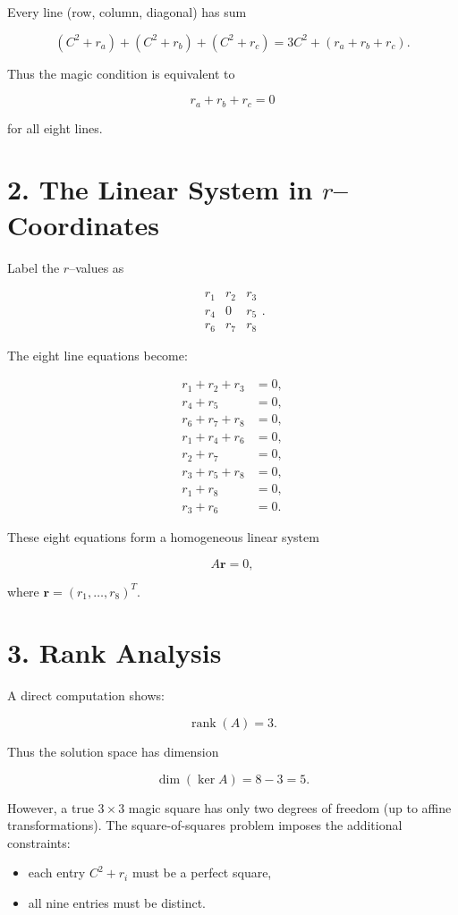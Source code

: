 \documentclass[12pt]{article}
\begin{document}
Every line (row, column, diagonal) has sum


\[
(C^2+r_a)+(C^2+r_b)+(C^2+r_c)
= 3C^2 + (r_a+r_b+r_c).
\]


Thus the magic condition is equivalent to


\[
r_a+r_b+r_c = 0
\]


for all eight lines.

\section*{2. The Linear System in $r$--Coordinates}

Label the $r$--values as


\[
\begin{matrix}
r_1 & r_2 & r_3 \\
r_4 & 0   & r_5 \\
r_6 & r_7 & r_8
\end{matrix}.
\]



The eight line equations become:


\[
\begin{aligned}
r_1+r_2+r_3 &= 0,\\
r_4+r_5 &= 0,\\
r_6+r_7+r_8 &= 0,\\
r_1+r_4+r_6 &= 0,\\
r_2+r_7 &= 0,\\
r_3+r_5+r_8 &= 0,\\
r_1+r_8 &= 0,\\
r_3+r_6 &= 0.
\end{aligned}
\]



These eight equations form a homogeneous linear system


\[
A\mathbf{r} = 0,
\]


where $\mathbf{r}=(r_1,\dots,r_8)^T$.

\section*{3. Rank Analysis}

A direct computation shows:


\[
\operatorname{rank}(A)=3.
\]


Thus the solution space has dimension


\[
\dim(\ker A)=8-3=5.
\]



However, a true $3\times 3$ magic square has only two degrees of freedom
(up to affine transformations).  
The square-of-squares problem imposes the additional constraints:
\begin{itemize}
    \item each entry $C^2+r_i$ must be a perfect square,
    \item all nine entries must be distinct.
\end{itemize}
\end{document}
